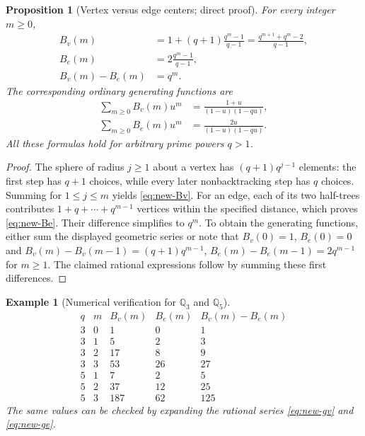 \documentclass[12pt,letterpaper]{amsart}
\numberwithin{equation}{section}
\newtheorem{proposition}[theorem]{Proposition}
\newtheorem{example}[theorem]{Example}
\theoremstyle{definition}
\theoremstyle{plain}
\begin{document}
\begin{proposition}[Vertex versus edge centers; direct proof]
\label{prop:new-ball}
For every integer $m\geq0$,
\begin{align}
 B_v(m)&=1+(q+1)\frac{q^m-1}{q-1}
       =\frac{q^{m+1}+q^m-2}{q-1},\label{eq:new-Bv}\\
 B_e(m)&=2\frac{q^m-1}{q-1},\label{eq:new-Be}\\
 B_v(m)-B_e(m)&=q^m.\label{eq:new-ball-diff}
\end{align}
The corresponding ordinary generating functions are
\begin{align}
 \sum_{m\geq0}B_v(m)u^m&=\frac{1+u}{(1-u)(1-qu)},
 \label{eq:new-gv}\\
 \sum_{m\geq0}B_e(m)u^m&=\frac{2u}{(1-u)(1-qu)}.
 \label{eq:new-ge}
\end{align}
All these formulas hold for arbitrary prime powers $q>1$.
\end{proposition}
\begin{proof}
The sphere of radius $j\geq1$ about a vertex has
$(q+1)q^{j-1}$ elements: the first step has $q+1$ choices,
while every later nonbacktracking step has $q$ choices.
Summing for $1\leq j\leq m$ yields \eqref{eq:new-Bv}.
For an edge, each of its two half-trees contributes
$1+q+\cdots+q^{m-1}$ vertices within the specified distance,
which proves \eqref{eq:new-Be}. Their difference simplifies to
$q^m$. To obtain the generating functions, either sum the
displayed geometric series or note that
$B_v(0)=1$, $B_e(0)=0$ and
$B_v(m)-B_v(m-1)=(q+1)q^{m-1}$,
$B_e(m)-B_e(m-1)=2q^{m-1}$ for $m\geq1$.
The claimed rational expressions follow by summing these first
differences.
\end{proof}

\begin{example}[Numerical verification for $\mathbb Q_3$ and
$\mathbb Q_5$]
\label{ex:new-balls}
\[
\begin{array}{c|c|r|r|r}
q&m&B_v(m)&B_e(m)&B_v(m)-B_e(m)\\\hline
3&0&1&0&1\\
3&1&5&2&3\\
3&2&17&8&9\\
3&3&53&26&27\\
5&1&7&2&5\\
5&2&37&12&25\\
5&3&187&62&125
\end{array}
\]
The same values can be checked by expanding the rational series
\eqref{eq:new-gv} and \eqref{eq:new-ge}.
\end{example}
\end{document}
